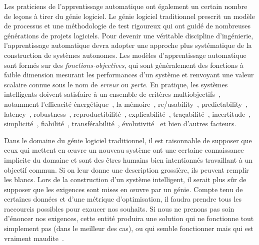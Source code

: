 Les praticiens de l'apprentissage automatique ont également un certain nombre de leçons à tirer du génie logiciel. Le génie logiciel traditionnel prescrit un modèle de processus et une méthodologie de test rigoureux qui ont guidé de nombreuses générations de projets logiciels. Pour devenir une véritable discipline d'ingénierie, l'apprentissage automatique devra adopter une approche plus systématique de la construction de systèmes autonomes. Les modèles d'apprentissage automatique sont formés sur des \textit{fonctions-objectives}, qui sont généralement des fonctions à faible dimension mesurant les performances d'un système et renvoyant une valeur scalaire connue sous le nom de \textit{erreur} ou \textit{perte}. En pratique, les systèmes intelligents doivent satisfaire à un ensemble de critères multiobjectifs~\citep{censi2015mathematics}, notamment l'efficacité énergétique~\citep{paull2010novel}, la mémoire~\citep{memory2013mitliagkas}, re/usability~\citep{breuleux2017automatic,deleu2019torchmeta}, predictability~\citep{turner2017well}, latency~\citep{ravanelli2018twin}, robustness~\citep{pineau2003policy}, reproductibilité~\citep{pineau2019improving}, explicabilité~\citep{turner2016model}, traçabilité~\citep{guo2017semantically, tsirigotis2018orion}, incertitude~\citep{diaz2018interactive}, simplicité~\citep{kastner2019representation}, fiabilité~\citep{xu2017efficient}, transférabilité~\citep{mehta2019active}, évolutivité~\citep{luan2019break} et bien d'autres facteurs.

Dans le domaine du génie logiciel traditionnel, il est raisonnable de supposer que ceux qui mettent en œuvre un nouveau système ont une certaine connaissance implicite du domaine et sont des êtres humains bien intentionnés travaillant à un objectif commun. Si on leur donne une description grossière, ils peuvent remplir les blancs. Lors de la construction d'un système intelligent, il serait plus sûr de supposer que les exigences sont mises en œuvre par un génie. Compte tenu de certaines données et d'une métrique d'optimisation, il faudra prendre tous les raccourcis possibles pour exaucer nos souhaits. Si nous ne prenons pas soin d'énoncer nos exigences, cette entité produira une solution qui ne fonctionne tout simplement pas (dans le meilleur des cas), ou qui semble fonctionner mais qui est vraiment maudite~\citep{bellman1957dynamic}.

